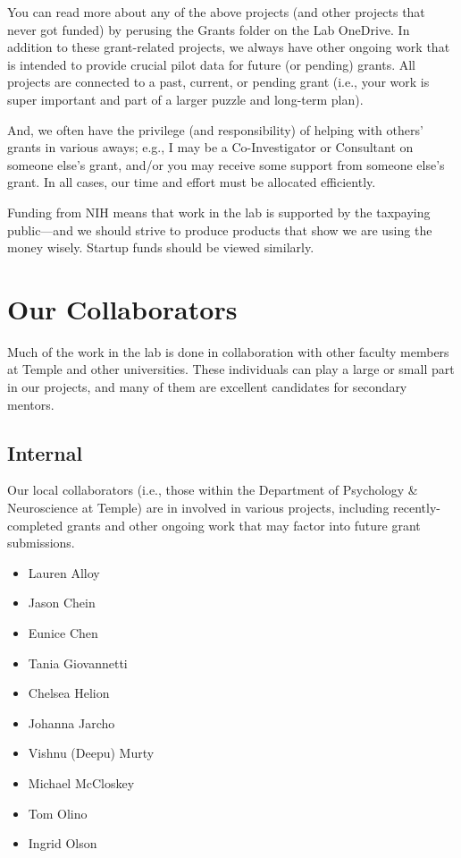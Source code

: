 \documentclass[letterpaper,11pt,oneside]{memoir}
\begin{document}
You can read more about any of the above projects (and other projects that never got funded) by perusing the Grants folder on the Lab OneDrive. In addition to these grant-related projects, we always have other ongoing work that is intended to provide crucial pilot data for future (or pending) grants. All projects are connected to a past, current, or pending grant (i.e., your work is super important and part of a larger puzzle and long-term plan).

And, we often have the privilege (and responsibility) of helping with others' grants in various aways; e.g., I may be a Co-Investigator or Consultant on someone else's grant, and/or you may receive some support from someone else's grant. In all cases, our time and effort must be allocated efficiently. 

Funding from NIH means that work in the lab is supported by the taxpaying public---and we should strive to produce products that show we are using the money wisely. Startup funds should be viewed similarly. 


\section{Our Collaborators}

Much of the work in the lab is done in collaboration with other faculty members at Temple and other universities. These individuals can play a large or small part in our projects, and many of them are excellent candidates for secondary mentors. 

\subsection{Internal}

Our local collaborators (i.e., those within the Department of Psychology \& Neuroscience at Temple) are in involved in various projects, including recently-completed grants and other ongoing work that may factor into future grant submissions. 

\begin{multicols}{2}
\begin{itemize}[noitemsep,nolistsep]
\item Lauren Alloy
\item Jason Chein
\item Eunice Chen
\item Tania Giovannetti
\item Chelsea Helion
\item Johanna Jarcho
\item Vishnu (Deepu) Murty
\item Michael McCloskey
\item Tom Olino
\item Ingrid Olson
\end{itemize}
\end{multicols}
\end{document}
